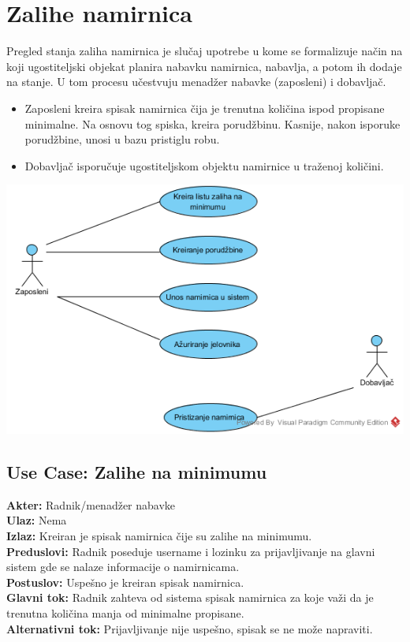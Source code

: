 \documentclass{article}
\begin{document}
\section{Zalihe namirnica}
Pregled stanja zaliha namirnica je slučaj upotrebe u kome se formalizuje način na koji ugostiteljski objekat planira nabavku namirnica, nabavlja, a potom ih dodaje na stanje. U tom procesu učestvuju menadžer nabavke (zaposleni) i dobavljač. 

\begin{itemize}
\item Zaposleni kreira spisak namirnica čija je trenutna količina ispod propisane minimalne. Na osnovu tog spiska, kreira porudžbinu. Kasnije, nakon isporuke porudžbine, unosi u bazu pristiglu robu.
\item Dobavljač isporučuje ugostiteljskom objektu namirnice u traženoj količini.
\end{itemize}
\includegraphics[width=\textwidth]{zalihe.png}
\subsection{\textbf{Use Case}: Zalihe na minimumu}
\textbf{Akter:} Radnik/menadžer nabavke\\
\textbf{Ulaz:} Nema\\
\textbf{Izlaz:} Kreiran je spisak namirnica čije su zalihe na minimumu.\\
\textbf{Preduslovi:} Radnik poseduje username i lozinku za prijavljivanje na glavni sistem gde se nalaze informacije o namirnicama.\\
\textbf{Postuslov:} Uspešno je kreiran spisak namirnica.\\
\textbf{Glavni tok:} Radnik zahteva od sistema spisak namirnica za koje važi da je trenutna količina manja od minimalne propisane.\\
\textbf{Alternativni tok:} Prijavljivanje nije uspešno, spisak se ne može napraviti.\\
\end{document}
